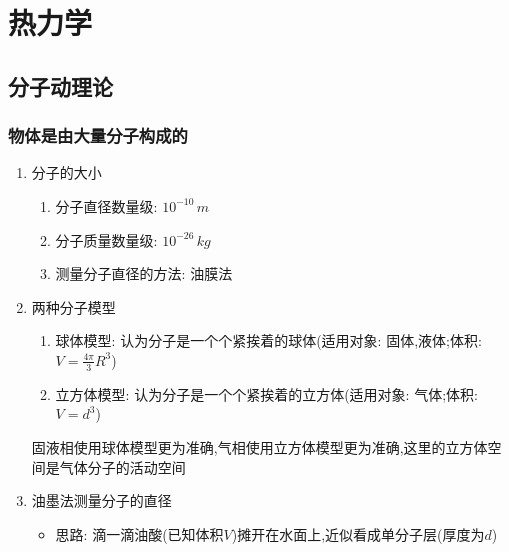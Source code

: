 \documentclass{article}
\begin{document}
\vspace{2em}

\section{热力学}
\subsection{分子动理论}
\subsubsection{物体是由大量分子构成的}
\begin{enumerate}
    \item 分子的大小
          \begin{enumerate}[label = (\arabic*{})]
              \item 分子直径数量级: $10^{-10} \, m$
              \item 分子质量数量级: $10^{-26} \, kg$
              \item 测量分子直径的方法: 油膜法
          \end{enumerate}

          \vspace{2em}

    \item 两种分子模型
          \begin{enumerate}[label = (\arabic*{})]
              \item 球体模型: 认为分子是一个个紧挨着的球体(适用对象: 固体,液体;体积:$V = \frac{4\pi}{3} R^{3}$)
              \item 立方体模型: 认为分子是一个个紧挨着的立方体(适用对象: 气体;体积:$V = d^{3}$)
          \end{enumerate}

          \vspace{-1em}
          \hspace{1em}\begin{adjustbox}{minipage=0.86\linewidth, bgcolor=gray!20, padding=1em}
              \small
              固液相使用球体模型更为准确,气相使用立方体模型更为准确,这里的立方体空间是气体分子的活动空间
          \end{adjustbox}
          \vspace{-1em}

          \vspace{2em}

    \item 油墨法测量分子的直径
          \begin{itemize}
              \item 思路: 滴一滴油酸(已知体积$V$)摊开在水面上,近似看成单分子层(厚度为$d$)
              

\end{itemize}
\end{enumerate}
\end{document}
